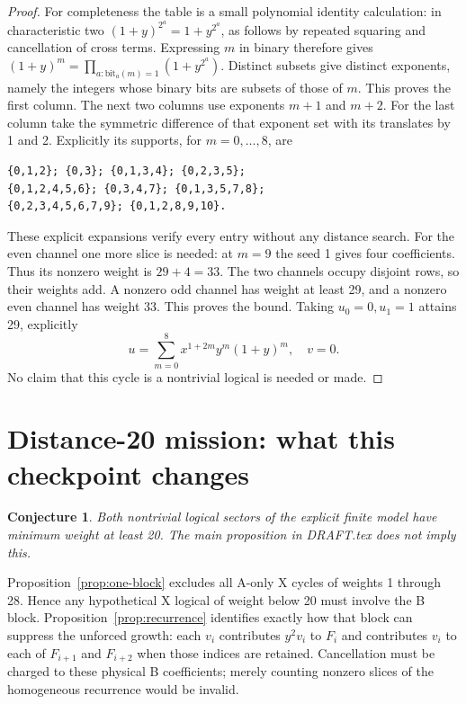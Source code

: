 \documentclass{article}
\newtheorem*{conjecture*}{Conjecture}
\begin{document}
\begin{proof}
  For completeness the table is a small polynomial identity calculation: in characteristic
  two \((1 + y)^{2^a} = 1 + y^{2^a}\), as follows by repeated squaring and cancellation of
  cross terms. Expressing \(m\) in binary therefore gives
  \((1 + y)^m = \prod_{a : \text{bit}_a(m) = 1} (1 + y^{2^a})\). Distinct subsets give
  distinct exponents, namely the integers whose binary bits are subsets of those of \(m\).
  This proves the first column. The next two columns use exponents \(m + 1\) and
  \(m + 2\). For the last column take the symmetric difference of that exponent set with
  its translates by 1 and 2. Explicitly its supports, for \(m = 0, \dots, 8\), are
\begin{verbatim}
{0,1,2}; {0,3}; {0,1,3,4}; {0,2,3,5};
{0,1,2,4,5,6}; {0,3,4,7}; {0,1,3,5,7,8};
{0,2,3,4,5,6,7,9}; {0,1,2,8,9,10}.
\end{verbatim}
  These explicit expansions verify every entry without any distance search. For the even
  channel one more slice is needed: at \(m = 9\) the seed 1 gives four coefficients. Thus
  its nonzero weight is \(29 + 4 = 33\). The two channels occupy disjoint rows, so their
  weights add. A nonzero odd channel has weight at least 29, and a nonzero even channel
  has weight 33. This proves the bound. Taking \(u_0 = 0, u_1 = 1\) attains 29, explicitly
  \begin{equation}
    u = \sum_{m=0}^{8} x^{1+2m} y^m (1 + y)^m, \quad v = 0.
  \end{equation}
  No claim that this cycle is a nontrivial logical is needed or made.
\end{proof}

\section{Distance-20 mission: what this checkpoint changes}\label{sec:mission}

\begin{conjecture*}
  Both nontrivial logical sectors of the explicit finite model have minimum weight at
  least 20. The main proposition in DRAFT.tex does not imply this.
\end{conjecture*}

Proposition~\ref{prop:one-block} excludes all A-only X cycles of weights 1 through 28.
Hence any hypothetical X logical of weight below 20 must involve the B block.
Proposition~\ref{prop:recurrence} identifies exactly how that block can suppress the
unforced growth: each \(v_i\) contributes \(y^2 v_i\) to \(F_i\) and contributes \(v_i\)
to each of \(F_{i+1}\) and \(F_{i+2}\) when those indices are retained. Cancellation must
be charged to these physical B coefficients; merely counting nonzero slices of the
homogeneous recurrence would be invalid.
\end{document}
